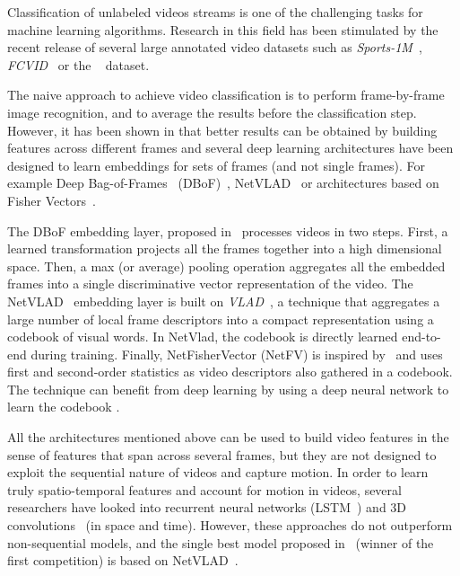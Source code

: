 Classification of unlabeled videos streams is one of the challenging tasks for machine learning algorithms.
Research in this field has been stimulated by the recent release of several large annotated video datasets such as \emph{Sports-1M}~\cite{karpathy2014large}, \emph{FCVID}~\cite{FCVID} or the \yt~\cite{abu2016youtube} dataset.

The naive approach to achieve video classification is to perform frame-by-frame image recognition, and to average the results before the classification step.
However, it has been shown in \cite{abu2016youtube,miech2017learnable} that  better results can be obtained by building features across different frames and several deep learning architectures have been designed to learn embeddings for sets of frames (and not single frames).
For example Deep Bag-of-Frames ~(DBoF)~\cite{abu2016youtube}, NetVLAD~\cite{Arandjelovic16} or architectures based on Fisher Vectors~\cite{4270291}. 


The DBoF embedding layer, proposed in~\cite{abu2016youtube} processes videos in two steps. 
First, a learned transformation projects all the frames together into a high dimensional space. 
Then, a max (or average) pooling operation aggregates all the embedded frames into a single discriminative vector  representation of the video.
The NetVLAD~\cite{Arandjelovic16} embedding layer is built on \emph{VLAD}~\cite{jegou:inria-00548637}, a technique that aggregates a large number of local frame descriptors into a compact representation using a codebook of visual words.
In NetVlad, the codebook is directly learned end-to-end during training.
Finally, NetFisherVector (NetFV) is inspired by~\cite{4270291} and uses  first and second-order statistics as video descriptors also gathered in a codebook.
The technique can benefit from deep learning by using a deep neural network to learn the codebook \cite{miech2017learnable}.

All the architectures mentioned above can be used to build video features in the sense of features that span across several frames, but they are not designed to exploit the sequential nature of videos and capture motion.
In order to learn truly spatio-temporal features and account for motion in videos, several researchers have looked into recurrent neural networks (\eg LSTM~\cite{yue2015beyond,DBLP:journals/corr/LiGLBLLLZW17}) and 3D convolutions~\cite{karpathy2014large} (in space and time).
However, these approaches do not  outperform non-sequential models, and  the single best model proposed in~\cite{miech2017learnable} (winner of the first \yt competition) is based on NetVLAD~\cite{Arandjelovic16}. 

